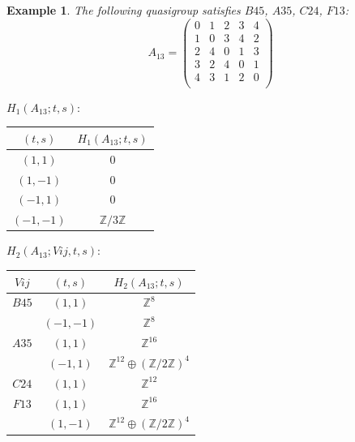 \documentclass[11pt]{amsart}
\newtheorem{example}[theorem]{Example}
\theoremstyle{definition}
\newcommand{\Z}{\mathbb{Z}}
\begin{document}
\begin{example}
The following quasigroup satisfies 
$B45$, $A35$, $C24$, $F13$:
   \[ A_{13} = \left(
\begin{array}{ccccc}
 0 & 1 & 2 & 3 & 4 \\
 1 & 0 & 3 & 4 & 2 \\
 2 & 4 & 0 & 1 & 3 \\
 3 & 2 & 4 & 0 & 1 \\
 4 & 3 & 1 & 2 & 0 \\
\end{array}
\right)\]


\bigskip


$H_1(A_{13};t,s):$

\begin{center}
    
\begin{tabular}{c|c}
    $(t,s)$ & $H_1(A_{13};t,s)$  \\
    \hline
    $(1,1)$ & $0$ \\
    $(1,-1)$ & $0$ \\
    $(-1,1)$ & $0$ \\
    $(-1,-1)$ & $\Z/3\Z$ \\
\end{tabular}
\end{center}
\bigskip

$H_2(A_{13};Vij,t,s):$

\begin{center}
    
\begin{tabular}{c|c|c}
    $Vij$ & $(t,s)$ & $H_2(A_{13};t,s)$  \\
    \hline

    $B45$ & $(1,1)$ & $\Z^8$ \\
        & $(-1,-1)$ & $\Z^8$ \\
    $A35$ & $(1,1)$ & $\Z^{16}$ \\
        & $(-1,1)$ & $\Z^{12} \oplus (\Z/2\Z)^4$ \\
    $C24$ & $(1,1)$ & $\Z^{12}$ \\
    $F13$ & $(1,1)$ & $\Z^{16}$ \\
        & $(1,-1)$ & $\Z^{12} \oplus (\Z/2\Z)^4$ \\
\end{tabular}

\end{center}

\end{example}
\end{document}
